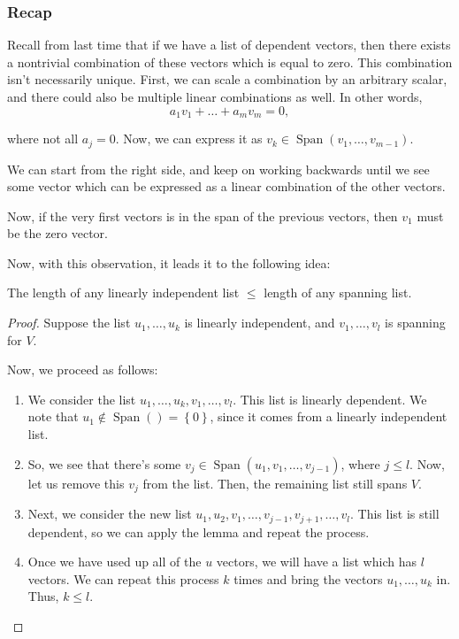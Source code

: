 \documentclass[openany]{book}
\DeclareMathOperator*{\Span}{Span}
\begin{document}
	\subsubsection{Recap}
	
	Recall from last time that if we have a list of dependent vectors, then there exists a nontrivial combination of these vectors which is equal to zero. This combination isn't necessarily unique. First, we can scale a combination by an arbitrary scalar, and there could also be multiple linear combinations as well. In other words,
	\begin{equation*}
		a_{1}v_{1} + \ldots + a_{m}v_{m} = 0,
	\end{equation*}

	where not all $a_{j} = 0$. Now, we can express it as $v_{k} \in \Span(v_{1}, \ldots, v_{m-1})$.
	
	We can start from the right side, and keep on working backwards until we see some vector which can be expressed as a linear combination of the other vectors.
	
	Now, if the very first vectors is in the span of the previous vectors, then $v_{1}$ must be the zero vector.
	
	Now, with this observation, it leads it to the following idea:
	\begin{thm}
		The length of any linearly independent list $\leq$ length of any spanning list.
	\end{thm}
	\begin{proof}
		Suppose the list $u_{1}, \ldots, u_{k}$ is linearly independent, and $v_{1}, \ldots, v_{l}$ is spanning for $V$.
		
		Now, we proceed as follows:
		\begin{enumerate}
			\item We consider the list $u_{1}, \ldots, u_{k}, v_{1}, \ldots, v_{l}$. This list is linearly dependent. We note that $u_{1} \not\in \Span( ) = \left\{  0\right\}$, since it comes from a linearly independent list. 
			
			\item So, we see that there's some $v_{j} \in \Span(u_{1}, v_{1}, \ldots, v_{j-1})$, where $j \leq l$. Now, let us remove this $v_{j}$ from the list. Then, the remaining list still spans $V$.
			
			\item Next, we consider the new list $u_{1}, u_{2}, v_{1}, \ldots, v_{j-1}, v_{j+1}, \ldots, v_{l}$. This list is still dependent, so we can apply the lemma and repeat the process.
			
			\item Once we have used up all of the $u$ vectors, we will have a list which has $l$ vectors. We can repeat this process $k$ times and bring the vectors $u_{1}, \ldots, u_{k}$ in. Thus, $k \leq l$.
		\end{enumerate}
	\end{proof}
\end{document}
